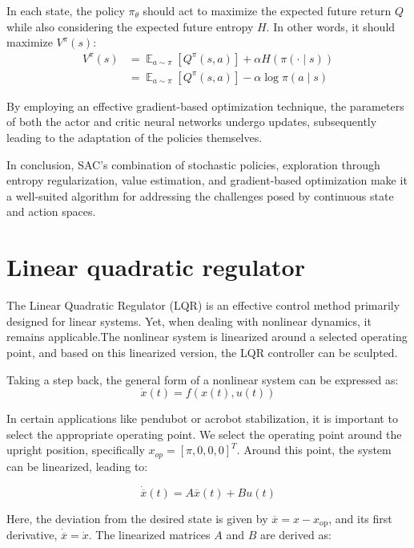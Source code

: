 In each state, the policy \(\pi_\theta\) should act to maximize the expected
future return \(Q\) while also considering the expected future entropy \(H\). In other
words, it should maximize \(V^\pi(s)\):
\begin{align}
 V^\pi(s) &= {\displaystyle \mathop{\mathbb{E}}_{a\sim\pi}[Q^\pi(s,a)]} +
 \alpha{H(\pi(\cdot\mid{s}))} \\
 &= {\displaystyle \mathop{\mathbb{E}}_{a\sim\pi}[Q^\pi(s,a)]} -
 \alpha{\log {\pi(a\mid{s})}}
\end{align}


By employing an effective gradient-based optimization technique, the parameters
of both the actor and critic neural networks undergo updates, subsequently
leading to the adaptation of the policies themselves.

In conclusion, SAC's combination of stochastic policies, exploration through
entropy regularization, value estimation, and gradient-based optimization make
it a well-suited algorithm for addressing the challenges posed by continuous
state and action spaces.

\section{Linear quadratic regulator}
The Linear Quadratic Regulator (LQR)\cite{lehtomaki1981robustness} is an effective control method primarily designed for linear systems. Yet, when dealing with nonlinear dynamics, it remains applicable.The nonlinear system is linearized around a selected operating point, and based on this linearized version, the LQR controller can be sculpted.

Taking a step back, the general form of a nonlinear system can be expressed as:
\begin{equation}
 \dot{x}(t) = f(x(t), u(t))
\end{equation}


In certain applications like pendubot or acrobot stabilization, it is important to select the appropriate operating point. We select the operating point around the upright position, specifically \(x_{op} = [\pi,0,0,0]^T\). Around this point, the system can be linearized, leading to:

\begin{equation}
\dot{\overline{x}}(t) = A \overline{x}(t) + B u(t)
\end{equation}


Here, the deviation from the desired state is given by \(\overline{x} = x - x_{\text{op}}\), and its first derivative, \(\dot{\overline{x}} = \dot{x}\). The linearized  matrices \(A\) and \(B\) are derived as:

